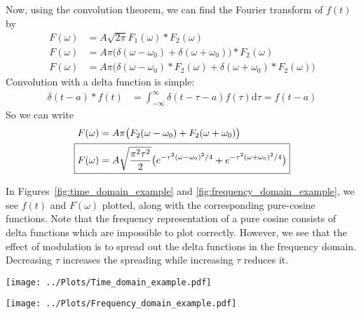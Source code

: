 \documentclass[twocolumn]{myarticle}
\renewcommand{\d}{\mathrm{d}}
\begin{document}
Now, using the convolution theorem, we can find the Fourier transform of $ f(t) $ by
\begin{align}
    F(\omega) &= A \sqrt{2 \pi} F_1(\omega) * F_2(\omega)
    \\
    F(\omega) &= A \pi \big( \delta(\omega - \omega_0) + \delta(\omega + \omega_0) \big) * F_2(\omega)
    \\
    F(\omega) &= A \pi \big( \delta(\omega - \omega_0) * F_2(\omega) + \delta(\omega + \omega_0) * F_2(\omega) \big)
\end{align}
Convolution with a delta function is simple:
\begin{align}
    \delta(t-a) * f(t) &= \int_{-\infty}^{\infty} \delta(t - \tau - a) f(\tau) \d \tau = f(t - a)
\end{align}
So we can write
\begin{align}
    F(\omega) &= A \pi \big( F_2(\omega - \omega_0) + F_2(\omega + \omega_0) \big)
    \\
    \Aboxed{F(\omega) &= A \sqrt{\frac{\pi^2 \tau^2}{2}} \big( e^{-\tau^2 (\omega - \omega_0)^2 / 4} + e^{- \tau^2 (\omega + \omega_0)^2/4} \big)}
\end{align}

In Figures~\ref{fig:time_domain_example} and \ref{fig:frequency_domain_example}, we see $ f(t) $ and $ F(\omega) $ plotted, along with the corresponding pure-cosine functions.
Note that the frequency representation of a pure cosine consists of delta functions which are impossible to plot correctly.
However, we see that the effect of modulation is to spread out the delta functions in the frequency domain.
Decreasing $ \tau $ increases the spreading while increasing $ \tau $ reduces it.


\begin{figure*}[ht]
    \centering
    \texttt{[image: ../Plots/Time\_domain\_example.pdf]}
    \caption{A pure cosine and a modulated cosine in the time domain.}
    \label{fig:time_domain_example}
\end{figure*}

\begin{figure*}[ht]
    \centering
    \texttt{[image: ../Plots/Frequency\_domain\_example.pdf]}
    \caption{A pure cosine and a modulated cosine in the frequency domain.}
    \label{fig:frequency_domain_example}
\end{figure*}
\end{document}
